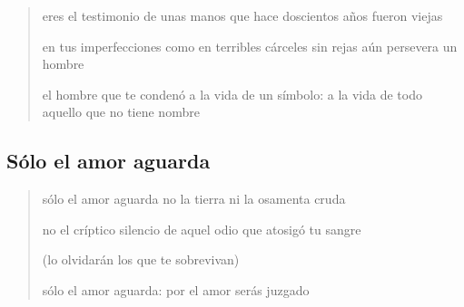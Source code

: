 \documentclass[a4paper, 12pt]{article}
\begin{document}
\begin{verse}
    
eres el testimonio de unas manos
que hace doscientos años fueron viejas
~

en tus imperfecciones
como en terribles cárceles sin rejas
aún persevera un hombre
~

el hombre que te condenó a la vida
de un símbolo: a la vida
de todo aquello que no tiene nombre
\end{verse}

\pagebreak 

\subsection{Sólo el amor aguarda}

\begin{verse}
sólo el amor aguarda 
no la tierra ni la osamenta cruda
~ 

no el críptico silencio de aquel odio 
que atosigó tu sangre
~ 

(lo olvidarán los que te sobrevivan)
~ 

sólo el amor aguarda:
por el amor serás juzgado


\end{verse}

\pagebreak 
\end{document}
